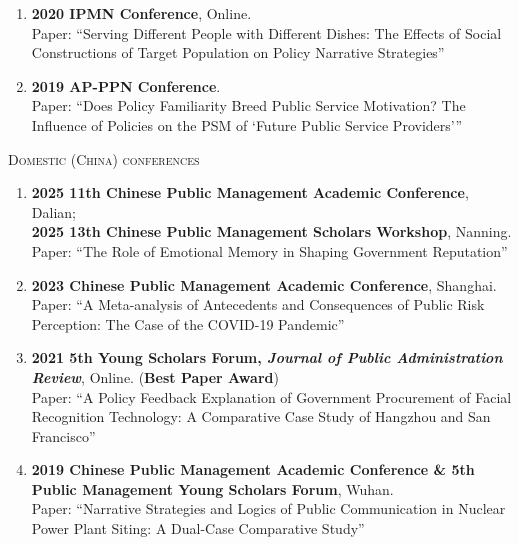 \documentclass[11pt, a4paper]{article}
\begin{document}
\begin{enumerate}[itemsep=5pt]
    \item \textbf{2020 IPMN Conference}, Online. \\
    Paper: ``Serving Different People with Different Dishes:
    The Effects of Social Constructions of Target Population on Policy Narrative Strategies''

    \item \textbf{2019 AP-PPN Conference}. \\
    Paper: ``Does Policy Familiarity Breed Public Service Motivation?
    The Influence of Policies on the PSM of `Future Public Service Providers'''
\end{enumerate}

\vspace{6pt}
\textsc{Domestic (China) conferences}
\vspace{4pt}
\begin{enumerate}[itemsep=5pt]
    \item \textbf{2025 11th Chinese Public Management Academic Conference}, Dalian;\ \\
    \textbf{2025 13th Chinese Public Management Scholars Workshop}, Nanning. \\
    Paper: ``The Role of Emotional Memory in Shaping Government Reputation''

    \item \textbf{2023 Chinese Public Management Academic Conference}, Shanghai. \\
    Paper: ``A Meta-analysis of Antecedents and Consequences of Public Risk
    Perception: The Case of the COVID-19 Pandemic''

    \item \textbf{2021 5th Young Scholars Forum,
    \textit{Journal of Public Administration Review}}, Online.
    (\textbf{Best Paper Award}) \\
    Paper: ``A Policy Feedback Explanation of Government Procurement of Facial
    Recognition Technology: A Comparative Case Study of Hangzhou and San Francisco''

    \item \textbf{2019 Chinese Public Management Academic Conference \&
    5th Public Management Young Scholars Forum}, Wuhan. \\
    Paper: ``Narrative Strategies and Logics of Public Communication in Nuclear
    Power Plant Siting: A Dual-Case Comparative Study''
\end{enumerate}

\end{document}
